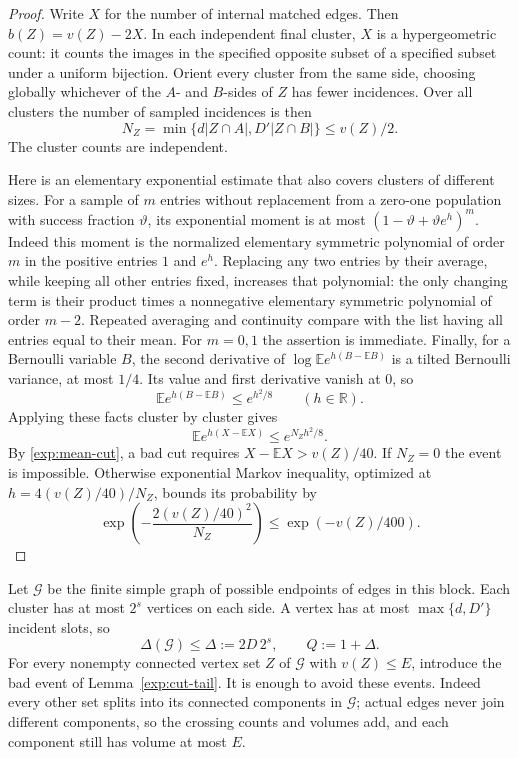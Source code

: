 \begin{proof}
Write $X$ for the number of internal matched edges. Then
$b(Z)=v(Z)-2X$. In each independent final cluster, $X$ is a
hypergeometric count: it counts the images in the specified opposite
subset of a specified subset under a uniform bijection. Orient every
cluster from the same side, choosing globally whichever of the
$A$- and $B$-sides of $Z$ has fewer incidences.
Over all clusters the number of sampled incidences is then
\[
 N_Z=\min\{d|Z\cap A|,D'|Z\cap B|\}\leq v(Z)/2.
\]
The cluster counts are independent.

Here is an elementary exponential estimate that also covers clusters
of different sizes. For a sample of $m$ entries without replacement
from a zero-one population with success fraction $\vartheta$, its
exponential moment is at most $(1-\vartheta+\vartheta e^h)^m$.
Indeed this moment is the normalized elementary symmetric polynomial
of order $m$ in the positive entries $1$ and $e^h$.
Replacing any two entries by their average, while keeping all other
entries fixed, increases that polynomial: the only changing term
is their product times a nonnegative elementary symmetric polynomial
of order $m-2$. Repeated averaging and continuity compare with
the list having all entries equal to their mean. For $m=0,1$ the
assertion is immediate. Finally, for a Bernoulli variable $B$,
the second derivative of $\log\mathbb E e^{h(B-\mathbb EB)}$
is a tilted Bernoulli variance, at most $1/4$. Its value and first
derivative vanish at $0$, so
\[
 \mathbb E e^{h(B-\mathbb EB)}\leq e^{h^2/8}
 \qquad(h\in\mathbb R).
\]
Applying these facts cluster by cluster gives
\[
 \mathbb E e^{h(X-\mathbb EX)}\leq e^{N_Zh^2/8}.
\]
By \eqref{exp:mean-cut}, a bad cut requires
$X-\mathbb EX>v(Z)/40$. If $N_Z=0$ the event is impossible.
Otherwise exponential Markov inequality, optimized at
$h=4(v(Z)/40)/N_Z$, bounds its probability by
\[
 \exp\left(-\frac{2(v(Z)/40)^2}{N_Z}\right)
 \leq\exp(-v(Z)/400).
\]
\end{proof}

Let $\mathcal G$ be the finite simple graph of possible endpoints
of edges in this block. Each cluster has at most $2^s$ vertices on
each side. A vertex has at most $\max\{d,D'\}$ incident slots, so
\[
 \Delta(\mathcal G)\leq\Delta:=2D\,2^s,
 \qquad Q:=1+\Delta.
\]
For every nonempty connected vertex set $Z$ of $\mathcal G$ with
$v(Z)\leq E$, introduce the bad event of Lemma~\ref{exp:cut-tail}.
It is enough to avoid these events. Indeed every other set splits
into its connected components in $\mathcal G$; actual edges never
join different components, so the crossing counts and volumes add,
and each component still has volume at most $E$.

